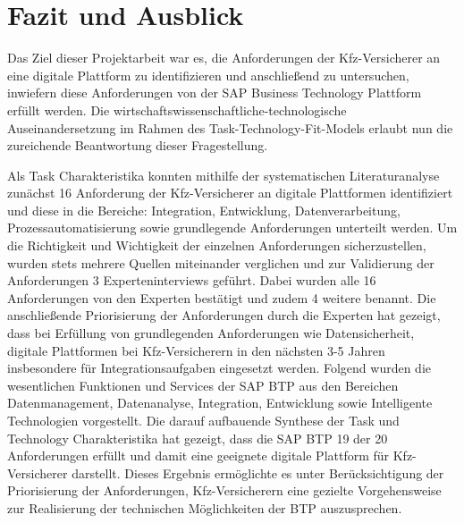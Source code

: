 \chapter{Fazit und Ausblick}

Das Ziel dieser Projektarbeit war es, die Anforderungen der Kfz-Versicherer an eine digitale Plattform zu identifizieren und anschließend zu untersuchen, inwiefern diese Anforderungen von der SAP Business Technology Plattform erfüllt werden. Die wirtschaftswissenschaftliche-technologische Auseinandersetzung im Rahmen des Task-Technology-Fit-Models erlaubt nun die zureichende Beantwortung dieser Fragestellung. 

Als Task Charakteristika konnten mithilfe der systematischen Literaturanalyse zunächst 16 Anforderung der Kfz-Versicherer an digitale Plattformen identifiziert und diese in die Bereiche: Integration, Entwicklung, Datenverarbeitung, Prozessautomatisierung sowie grundlegende Anforderungen unterteilt werden. Um die Richtigkeit und Wichtigkeit der einzelnen Anforderungen sicherzustellen, wurden stets mehrere Quellen miteinander verglichen und zur Validierung der Anforderungen 3 Experteninterviews geführt. Dabei wurden alle 16 Anforderungen von den Experten bestätigt und zudem 4 weitere benannt. Die anschließende Priorisierung der Anforderungen durch die Experten hat gezeigt, dass bei Erfüllung von grundlegenden Anforderungen wie Datensicherheit, digitale Plattformen bei Kfz-Versicherern in den nächsten 3-5 Jahren insbesondere für Integrationsaufgaben eingesetzt werden. Folgend wurden die wesentlichen Funktionen und Services der SAP BTP aus den Bereichen Datenmanagement, Datenanalyse, Integration, Entwicklung sowie Intelligente Technologien vorgestellt. Die darauf aufbauende Synthese der Task und Technology Charakteristika hat gezeigt, dass die SAP BTP 19 der 20 Anforderungen erfüllt und damit eine geeignete digitale Plattform für Kfz-Versicherer darstellt. Dieses Ergebnis ermöglichte es unter Berücksichtigung der Priorisierung der Anforderungen, Kfz-Versicherern eine gezielte Vorgehensweise zur Realisierung der technischen Möglichkeiten der BTP auszusprechen.

